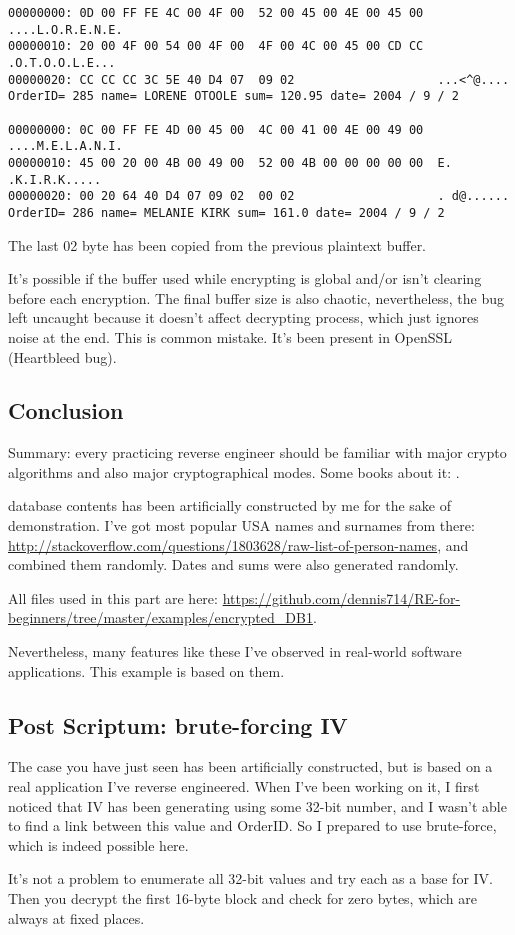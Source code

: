 \begin{lstlisting}
00000000: 0D 00 FF FE 4C 00 4F 00  52 00 45 00 4E 00 45 00  ....L.O.R.E.N.E.
00000010: 20 00 4F 00 54 00 4F 00  4F 00 4C 00 45 00 CD CC   .O.T.O.O.L.E...
00000020: CC CC CC 3C 5E 40 D4 07  09 02                    ...<^@....
OrderID= 285 name= LORENE OTOOLE sum= 120.95 date= 2004 / 9 / 2

00000000: 0C 00 FF FE 4D 00 45 00  4C 00 41 00 4E 00 49 00  ....M.E.L.A.N.I.
00000010: 45 00 20 00 4B 00 49 00  52 00 4B 00 00 00 00 00  E. .K.I.R.K.....
00000020: 00 20 64 40 D4 07 09 02  00 02                    . d@......
OrderID= 286 name= MELANIE KIRK sum= 161.0 date= 2004 / 9 / 2
\end{lstlisting}

The last 02 byte has been copied from the previous plaintext buffer.

It's possible if the buffer used while encrypting is global and/or isn't clearing before
each encryption.
The final buffer size is also chaotic, nevertheless, the bug left uncaught
because it doesn't affect decrypting process, which just ignores noise at the end.
This is common mistake.
It's been present in OpenSSL (Heartbleed bug).

\subsection{Conclusion}

Summary:
every practicing reverse engineer should be familiar with major crypto algorithms and
also major cryptographical modes.
Some books about it: .

 database contents has been artificially constructed by me for the sake of demonstration.
I've got most popular USA names and surnames from there: \url{http://stackoverflow.com/questions/1803628/raw-list-of-person-names},
and combined them randomly.
Dates and sums were also generated randomly.

All files used in this part are here: \url{https://github.com/dennis714/RE-for-beginners/tree/master/examples/encrypted_DB1}.

Nevertheless, many features like these I've observed in real-world software applications.
This example is based on them.

\subsection{Post Scriptum: brute-forcing \ac{IV}}

The case you have just seen has been artificially constructed, but is based on a real application I've reverse engineered.
When I've been working on it, I first noticed that \ac{IV} has been generating using some 32-bit number,
and I wasn't able to find a link between this value and OrderID.
So I prepared to use brute-force, which is indeed possible here.

It's not a problem to enumerate all 32-bit values and try each as a base for \ac{IV}.
Then you decrypt the first 16-byte block and check for zero bytes, which are always at fixed places.
